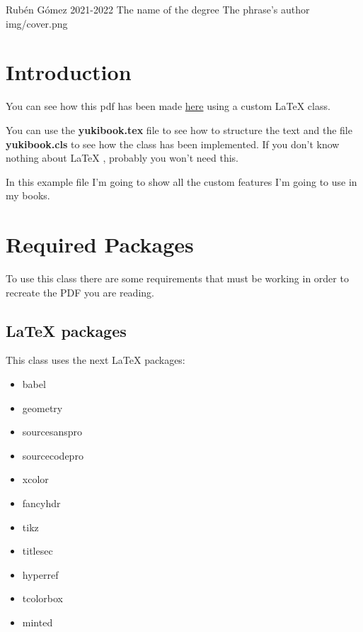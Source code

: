 \documentclass{yukibook}
\begin{document}
  {Rubén Gómez}  %
  {2021-2022}    %
  {The name \linebreak of the degree} %
  {}	%
  {The phrase's author}	%
  {img/cover.png}



\chapter{Introduction}
You can see how this pdf has been made \href{https://github.com/yuki/yukibook.cls}{here} using a custom \LaTeX{}  class.

You can use the \textbf{yukibook.tex} file to see how to structure the text and the file \textbf{yukibook.cls} to see how the class has been implemented. If you don't know nothing about \LaTeX{} , probably you won't need this.

In this example file I'm going to show all the custom features I'm going to use in my books.

\chapter{Required Packages}
To use this class there are some requirements that must be working in order to recreate the PDF you are reading.
\section{\LaTeX{} packages}

This class uses the next \LaTeX{} packages:
\begin{itemize}
  \item babel
  \item geometry
  \item sourcesanspro
  \item sourcecodepro
  \item xcolor
  \item fancyhdr
  \item tikz
  \item titlesec
  \item hyperref
  \item tcolorbox
  \item minted
\end{itemize}
\end{document}

